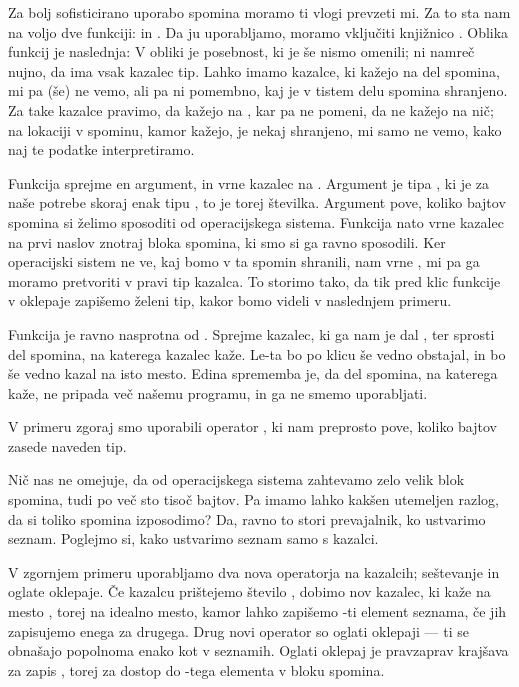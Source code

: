Za bolj sofisticirano uporabo spomina moramo ti vlogi prevzeti mi.
Za to sta nam na voljo dve funkciji:  in .
Da ju uporabljamo, moramo vključiti knjižnico .
Oblika funkcij je naslednja:
V obliki je posebnost, ki je še nismo omenili; ni namreč nujno, da ima vsak
kazalec tip.
Lahko imamo kazalce, ki kažejo na del spomina, mi pa (še) ne vemo, ali pa ni
pomembno, kaj je v tistem delu spomina shranjeno.
Za take kazalce pravimo, da kažejo na , kar pa ne pomeni, da ne
kažejo na nič; na lokaciji v spominu, kamor kažejo, je nekaj shranjeno, mi samo
ne vemo, kako naj te podatke interpretiramo.

Funkcija  sprejme en argument, in vrne kazalec na .
Argument je tipa , ki je za naše potrebe skoraj enak tipu
, to je torej številka.
Argument pove, koliko bajtov spomina si želimo sposoditi od operacijskega
sistema.
Funkcija  nato vrne kazalec na prvi naslov znotraj bloka spomina,
ki smo si ga ravno sposodili.
Ker operacijski sistem ne ve, kaj bomo v ta spomin shranili, nam 
vrne , mi pa ga moramo pretvoriti v pravi tip kazalca.
To storimo tako, da tik pred klic funkcije v oklepaje zapišemo želeni tip, kakor
bomo videli v naslednjem primeru.

Funkcija  je ravno nasprotna od .
Sprejme kazalec, ki ga nam je dal , ter sprosti del spomina, na
katerega kazalec kaže.
Le-ta bo po klicu  še vedno obstajal, in bo še vedno kazal na isto
mesto.
Edina sprememba je, da del spomina, na katerega kaže, ne pripada več našemu
programu, in ga ne smemo uporabljati.


V primeru zgoraj smo uporabili operator , ki nam preprosto pove,
koliko bajtov zasede naveden tip.


Nič nas ne omejuje, da od operacijskega sistema zahtevamo zelo velik blok
spomina, tudi po več sto tisoč bajtov.
Pa imamo lahko kakšen utemeljen razlog, da si toliko spomina izposodimo?
Da, ravno to stori prevajalnik, ko ustvarimo seznam.
Poglejmo si, kako ustvarimo seznam samo s kazalci.


V zgornjem primeru uporabljamo dva nova operatorja na kazalcih; seštevanje in
oglate oklepaje.
Če kazalcu  prištejemo število , dobimo
nov kazalec, ki kaže na mesto , torej na
idealno mesto, kamor lahko zapišemo -ti element seznama, če jih
zapisujemo enega za drugega.
Drug novi operator so oglati oklepaji --- ti se obnašajo popolnoma enako kot
v seznamih.
Oglati oklepaj  je pravzaprav krajšava za zapis
, torej za dostop do -tega elementa v bloku spomina.

